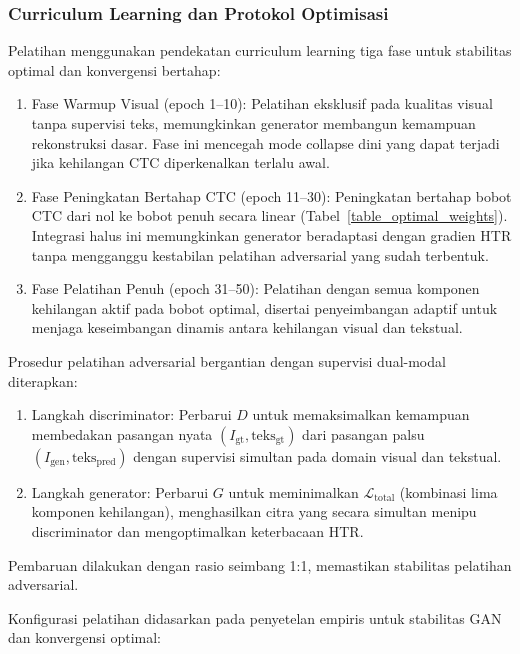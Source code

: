 \documentclass[journal]{IEEEtran}
\begin{document}
\subsubsection{Curriculum Learning dan Protokol Optimisasi}

Pelatihan menggunakan pendekatan curriculum learning tiga fase untuk stabilitas optimal dan konvergensi bertahap:

\begin{enumerate}
    \item Fase Warmup Visual (epoch 1--10): Pelatihan eksklusif pada kualitas visual tanpa supervisi teks, memungkinkan generator membangun kemampuan rekonstruksi dasar. Fase ini mencegah mode collapse dini yang dapat terjadi jika kehilangan CTC diperkenalkan terlalu awal.
    
    \item Fase Peningkatan Bertahap CTC (epoch 11--30): Peningkatan bertahap bobot CTC dari nol ke bobot penuh secara linear (Tabel~\ref{table_optimal_weights}). Integrasi halus ini memungkinkan generator beradaptasi dengan gradien HTR tanpa mengganggu kestabilan pelatihan adversarial yang sudah terbentuk.
    
    \item Fase Pelatihan Penuh (epoch 31--50): Pelatihan dengan semua komponen kehilangan aktif pada bobot optimal, disertai penyeimbangan adaptif untuk menjaga keseimbangan dinamis antara kehilangan visual dan tekstual.
\end{enumerate}

Prosedur pelatihan adversarial bergantian dengan supervisi dual-modal diterapkan:
\begin{enumerate}
    \item Langkah discriminator: Perbarui $D$ untuk memaksimalkan kemampuan membedakan pasangan nyata $(I_{\text{gt}}, \text{teks}_{\text{gt}})$ dari pasangan palsu $(I_{\text{gen}}, \text{teks}_{\text{pred}})$ dengan supervisi simultan pada domain visual dan tekstual.
    \item Langkah generator: Perbarui $G$ untuk meminimalkan $\mathcal{L}_{\text{total}}$ (kombinasi lima komponen kehilangan), menghasilkan citra yang secara simultan menipu discriminator dan mengoptimalkan keterbacaan HTR.
\end{enumerate}
Pembaruan dilakukan dengan rasio seimbang 1:1, memastikan stabilitas pelatihan adversarial.

Konfigurasi pelatihan didasarkan pada penyetelan empiris untuk stabilitas GAN dan konvergensi optimal:
\end{document}

